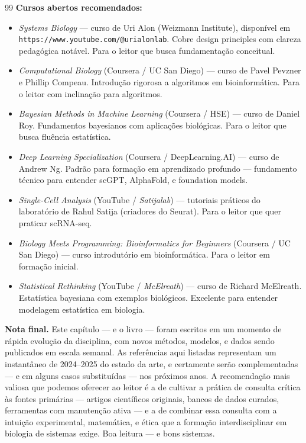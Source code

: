 \begin{thebibliography}{99}
\textbf{Cursos abertos recomendados:}
\begin{itemize}
  \item \emph{Systems Biology} --- curso de Uri Alon (Weizmann Institute), disponível em \texttt{https://www.youtube.com/@urialonlab}. Cobre design principles com clareza pedagógica notável. Para o leitor que busca fundamentação conceitual.
  \item \emph{Computational Biology} (Coursera / UC San Diego) --- curso de Pavel Pevzner e Phillip Compeau. Introdução rigorosa a algoritmos em bioinformática. Para o leitor com inclinação para algoritmos.
  \item \emph{Bayesian Methods in Machine Learning} (Coursera / HSE) --- curso de Daniel Roy. Fundamentos bayesianos com aplicações biológicas. Para o leitor que busca fluência estatística.
  \item \emph{Deep Learning Specialization} (Coursera / DeepLearning.AI) --- curso de Andrew Ng. Padrão para formação em aprendizado profundo --- fundamento técnico para entender scGPT, AlphaFold, e foundation models.
  \item \emph{Single-Cell Analysis} (YouTube / \emph{Satijalab}) --- tutoriais práticos do laboratório de Rahul Satija (criadores do Seurat). Para o leitor que quer praticar scRNA-seq.
  \item \emph{Biology Meets Programming: Bioinformatics for Beginners} (Coursera / UC San Diego) --- curso introdutório em bioinformática. Para o leitor em formação inicial.
  \item \emph{Statistical Rethinking} (YouTube / \emph{McElreath}) --- curso de Richard McElreath. Estatística bayesiana com exemplos biológicos. Excelente para entender modelagem estatística em biologia.
\end{itemize}

\end{thebibliography}

\noindent\textbf{Nota final.} Este capítulo --- e o livro --- foram escritos em um momento de rápida evolução da disciplina, com novos métodos, modelos, e dados sendo publicados em escala semanal. As referências aqui listadas representam um instantâneo de 2024--2025 do estado da arte, e certamente serão complementadas --- e em alguns casos substituídas --- nos próximos anos. A recomendação mais valiosa que podemos oferecer ao leitor é a de cultivar a prática de consulta crítica às fontes primárias --- artigos científicos originais, bancos de dados curados, ferramentas com manutenção ativa --- e a de combinar essa consulta com a intuição experimental, matemática, e ética que a formação interdisciplinar em biologia de sistemas exige. Boa leitura --- e bons sistemas.

